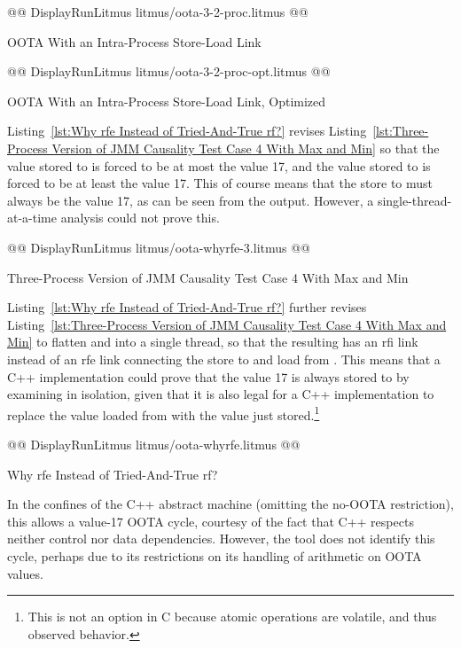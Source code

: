 \documentclass[10]{article}
\begin{document}
\begin{listing}[tbp]
@@ DisplayRunLitmus litmus/oota-3-2-proc.litmus @@
\caption{OOTA With an Intra-Process Store-Load Link}
\label{lst:OOTA With an Intra-Process Store-Load Link}
\end{listing}

\begin{listing}[tbp]
@@ DisplayRunLitmus litmus/oota-3-2-proc-opt.litmus @@
\caption{OOTA With an Intra-Process Store-Load Link, Optimized}
\label{lst:OOTA With an Intra-Process Store-Load Link, Optimized}
\end{listing}

Listing~\ref{lst:Why rfe Instead of Tried-And-True rf?}
revises
Listing~\ref{lst:Three-Process Version of JMM Causality Test Case 4 With Max and Min}
so that the value stored to  is forced to be at most the
value 17, and the value stored to  is forced to be at least the
value 17.
This of course means that the store to  must always be the value
17, as can be seen from the  output.
However, a single-thread-at-a-time analysis could not prove this.

\begin{listing}[tbp]
@@ DisplayRunLitmus litmus/oota-whyrfe-3.litmus @@
\caption{Three-Process Version of JMM Causality Test Case 4 With Max and Min}
\label{lst:Three-Process Version of JMM Causality Test Case 4 With Max and Min}
\end{listing}

Listing~\ref{lst:Why rfe Instead of Tried-And-True rf?}
further revises
Listing~\ref{lst:Three-Process Version of JMM Causality Test Case 4 With Max and Min}
to flatten  and  into a single thread, so that the
resulting  has an rfi link instead of an rfe link connecting
the store to and load from .
This means that a C++ implementation could prove that the value 17 is
always stored to  by examining  in isolation, given that
it is also legal for a C++ implementation to replace the value loaded
from  with the value just stored.\footnote{
	This is not an option in C because atomic operations are volatile,
	and thus observed behavior.}

\begin{listing}[tbp]
@@ DisplayRunLitmus litmus/oota-whyrfe.litmus @@
\caption{Why rfe Instead of Tried-And-True rf?}
\label{lst:Why rfe Instead of Tried-And-True rf?}
\end{listing}

In the confines of the C++ abstract machine (omitting the no-OOTA
restriction), this allows a value-17 OOTA cycle, courtesy of the fact
that C++ respects neither control nor data dependencies.
However, the  tool does not identify this cycle, perhaps due
to its restrictions on its handling of arithmetic on OOTA values.
\end{document}

